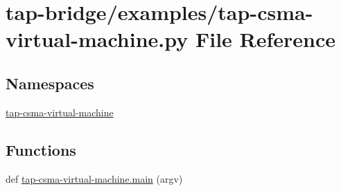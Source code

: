 \hypertarget{tap-csma-virtual-machine_8py}{}\section{tap-\/bridge/examples/tap-\/csma-\/virtual-\/machine.py File Reference}
\label{tap-csma-virtual-machine_8py}
\subsection*{Namespaces}
\begin{DoxyCompactItemize}
\item 
 \hyperlink{namespacetap-csma-virtual-machine}{tap-\/csma-\/virtual-\/machine}
\end{DoxyCompactItemize}
\subsection*{Functions}
\begin{DoxyCompactItemize}
\item 
def \hyperlink{namespacetap-csma-virtual-machine_a3ca74b02f38b0617a7152031aef45429}{tap-\/csma-\/virtual-\/machine.\+main} (argv)
\end{DoxyCompactItemize}
